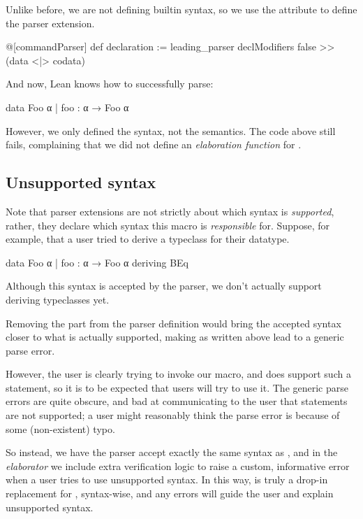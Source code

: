 Unlike before, we are not defining builtin syntax, so we use the  attribute to define the parser extension.

\begin{leancode}
    @[commandParser] def declaration := leading_parser 
        declModifiers false >> (data <|> codata)
\end{leancode}

And now, Lean knows how to successfully parse:
\begin{badleancode}
    data Foo α
      | foo : α → Foo α
\end{badleancode}

However, we only defined the syntax, not the semantics. 
The code above still fails, complaining that we did not define an \emph{elaboration function} for .


\subsection{Unsupported syntax}
Note that parser extensions are not strictly about which syntax is \emph{supported}, rather, they declare which syntax this macro is \emph{responsible} for.
Suppose, for example, that a user tried to derive a typeclass for their datatype.
\begin{badleancode}
    data Foo α
      | foo : α → Foo α
      deriving BEq
\end{badleancode}

Although this syntax is accepted by the \data{} parser, we don't actually support deriving typeclasses yet.

Removing the  part from the parser definition would bring the accepted syntax closer to what is actually supported, making  as written above lead to a generic parse error.

However, the user is clearly trying to invoke our \data{} macro, and \inductive{} does support such a  statement, so it is to be expected that users will try to use it. The generic parse errors are quite obscure, and bad at communicating to the user that  statements are not supported; a user might reasonably think the parse error is because of some (non-existent) typo.

So instead, we have the parser accept exactly the same syntax as \inductive{}, and in the \emph{elaborator} we include extra verification logic to raise a custom, informative error when a user tries to use unsupported syntax.
In this way, \data{} is truly a drop-in replacement for \inductive{}, syntax-wise, and any errors will guide the user and explain unsupported syntax.



